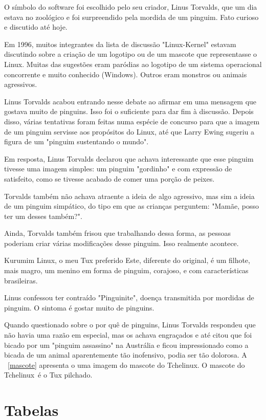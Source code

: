 \documentclass{book}
\newcommand{\tl}{Tchelinux}
\begin{document}
	
	O símbolo do software foi escolhido pelo seu criador, Linus Torvalds, que um dia estava no zoológico e foi surpreendido pela mordida de um pinguim. Fato curioso e discutido até hoje. 
	
	
	Em 1996, muitos integrantes da lista de discussão "Linux-Kernel" estavam discutindo sobre a criação de um logotipo ou de um mascote que representasse o Linux. Muitas das sugestões eram paródias ao logotipo de um sistema operacional concorrente e muito conhecido (Windows). Outros eram monstros ou animais agressivos. 
	
	Linus Torvalds acabou entrando nesse debate ao afirmar em uma mensagem que gostava muito de pinguins. Isso foi o suficiente para dar fim à discussão. Depois disso, várias tentativas foram feitas numa espécie de concurso para que a imagem de um pinguim servisse aos propósitos do Linux, até que Larry Ewing sugeriu a figura de um "pinguim sustentando o mundo". 
	
	Em resposta, Linus Torvalds declarou que achava interessante que esse pinguim tivesse uma imagem simples: um pinguim "gordinho" e com expressão de satisfeito, como se tivesse acabado de comer uma porção de peixes.
	
	Torvalds também não achava atraente a ideia de algo agressivo, mas sim a ideia de um pinguim simpático, do tipo em que as crianças perguntem: "Mamãe, posso ter um desses também?". 
	
	Ainda, Torvalds também frisou que trabalhando dessa forma, as pessoas poderiam criar várias modificações desse pinguim. Isso realmente acontece.
	
	Kurumim Linux, o meu Tux preferido
	Este, diferente do original, é um filhote, mais magro, um menino em forma de pinguim, corajoso, e com características brasileiras. 
	
	Linus confessou ter contraído "Pinguinite", doença transmitida por mordidas de pinguim. O sintoma é gostar muito de pinguins. 
	
	Quando questionado sobre o por quê de pinguins, Linus Torvalds respondeu que não havia uma razão em especial, mas os achava engraçados e até citou que foi bicado por um "pinguim assassino" na Austrália e ficou impressionado como a bicada de um animal aparentemente tão inofensivo, podia ser tão dolorosa. 
	A \figurename~\ref{mascote} apresenta o uma imagem do mascote do \tl. O mascote do \tl\ é
	o Tux pilchado.	
	
	
	
	
	\section{Tabelas}
	
\end{document}
